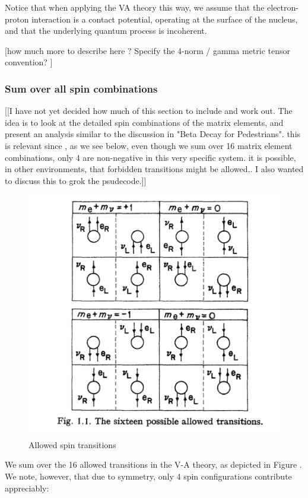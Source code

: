 \documentclass[%
 aip,
 jmp,%
 amsmath,amssymb,
 reprint,%
]{revtex4-1}
\begin{document}
Notice that when applying the VA theory this way, we assume that the electron-proton interaction is a contact potential, operating at the surface of the nucleus, and that the underlying quantum process is incoherent.  

[how much more to describe here ?  Specify the 4-norm / gamma metric tensor convention? ]


\subsubsection{Sum over all spin combinations}

[[I have not yet decided how much of this section to include and work out.  The idea is to look at the detailed spin combinations of the matrix elements, and present an analysis similar to the discussion in "Beta Decay for Pedestrians".  this is relevant since , as we see below, even though we sum over 16 matrix element combinations, only 4 are non-negative in this very specific system.  it is possible, in other environments, that forbidden transitions might be allowed.. I also wanted to discuss this to grok the psudecode.]]  


\begin{figure}
   \includegraphics[scale=0.5]{img/16-allowed.png}
   \caption{Allowed spin transitions}
  \label{fig:SC}
\end{figure}
We sum over the 16  allowed transitions in the V-A theory, as depicted in Figure \cite{fig:SC}.
We note, however, that due to symmetry, only 4 spin configurations contribute appreciably:
\end{document}
